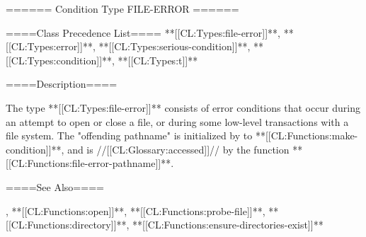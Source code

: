 ====== Condition Type FILE-ERROR ======

====Class Precedence List==== **[[CL:Types:file-error]]**, **[[CL:Types:error]]**, **[[CL:Types:serious-condition]]**, **[[CL:Types:condition]]**, **[[CL:Types:t]]**

====Description====

The type **[[CL:Types:file-error]]** consists of error conditions that occur during an attempt to open or close a file, or during some low-level transactions with a file system. The "offending pathname" is initialized by  to **[[CL:Functions:make-condition]]**, and is //[[CL:Glossary:accessed]]// by the function **[[CL:Functions:file-error-pathname]]**.

====See Also====

, **[[CL:Functions:open]]**, **[[CL:Functions:probe-file]]**, **[[CL:Functions:directory]]**, **[[CL:Functions:ensure-directories-exist]]**

